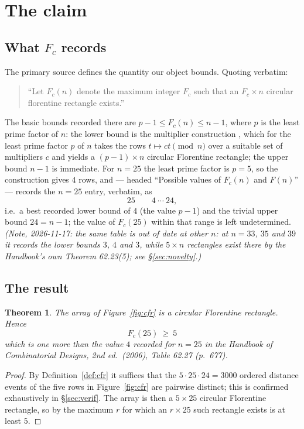 \documentclass[11pt]{amsart}
\newcommand{\Fc}{F_{c}}
\theoremstyle{plain}
\newtheorem{theorem}{Theorem}[section]
\theoremstyle{definition}
\theoremstyle{remark}
\begin{document}
\section{The claim}\label{sec:claim}

\subsection*{What $\Fc$ records}
The primary source defines the quantity our object bounds. Quoting
\cite[Def.\ 62.26, p.~677]{HCD} verbatim:
\begin{quote}
``Let $\Fc(n)$ denote the maximum integer $\Fc$ such that an
$\Fc\times n$ circular florentine rectangle exists.''
\end{quote}
The basic bounds recorded there are $p-1\le \Fc(n)\le n-1$, where $p$ is the
least prime factor of $n$: the lower bound is the multiplier construction
\cite[Construction 62.22(1), p.~676]{HCD}, which for the least prime factor
$p$ of $n$ takes the rows $t\mapsto ct\pmod n$ over a suitable set of
multipliers $c$ and yields a $(p-1)\times n$ circular Florentine rectangle;
the upper bound $n-1$ is immediate. For $n=25$ the least prime factor is
$p=5$, so the construction gives $4$ rows, and \cite[Table 62.27,
p.~677]{HCD} --- headed ``Possible values of $\Fc(n)$ and $F(n)$'' --- records
the $n=25$ entry, verbatim, as
\[
25\qquad 4\ \cdots\ 24 ,
\]
i.e.\ a best recorded lower bound of $4$ (the value $p-1$) and the trivial
upper bound $24=n-1$; the value of $\Fc(25)$ within that range is left
undetermined. \emph{(Note, 2026-11-17: the same table is out of date at
other $n$: at $n=33$, $35$ and $39$ it records the lower bounds $3$, $4$ and
$3$, while $5\times n$ rectangles exist there by the Handbook's own Theorem
62.23(5); see \S\ref{sec:novelty}.)}

\subsection*{The result}

\begin{theorem}\label{thm:main}
The array of Figure~\ref{fig:cfr} is a circular Florentine rectangle. Hence
\[
\boxed{\ \Fc(25)\ \ge\ 5\ }
\]
which is one more than the value $4$ recorded for $n=25$ in the
\emph{Handbook of Combinatorial Designs}, 2nd ed.\ (2006), Table 62.27
(p.~677).
\end{theorem}

\begin{proof}
By Definition~\ref{def:cfr} it suffices that the $5\cdot 25\cdot 24 = 3000$
ordered distance events of the five rows in Figure~\ref{fig:cfr} are pairwise
distinct; this is confirmed exhaustively in \S\ref{sec:verif}. The array is
then a $5\times 25$ circular Florentine rectangle, so by
\cite[Def.\ 62.26]{HCD} the maximum $r$ for which an $r\times 25$ such
rectangle exists is at least $5$.
\end{proof}
\end{document}
